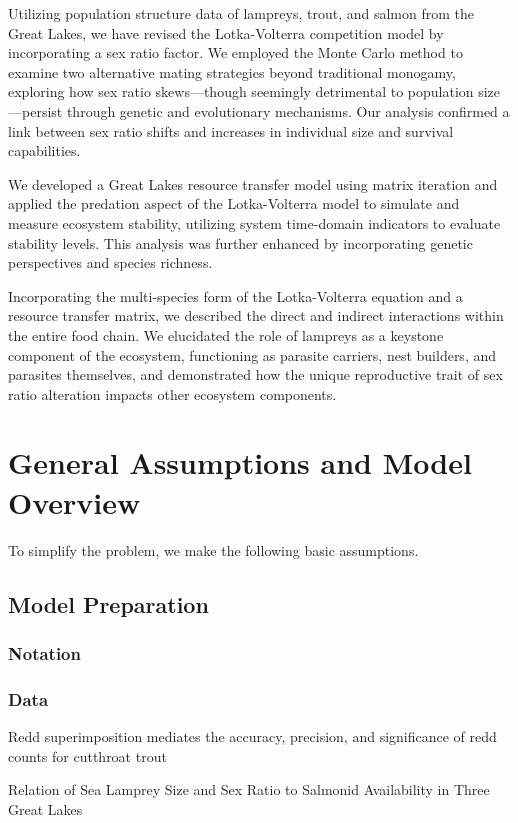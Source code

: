 \documentclass[12pt]{article}
\begin{document}
Utilizing population structure data of lampreys, trout, and salmon from the Great Lakes, we have revised the
Lotka-Volterra competition model by incorporating a sex ratio factor. We employed the Monte Carlo method to
examine two alternative mating strategies beyond traditional monogamy, exploring how sex ratio skews—though
seemingly detrimental to population size—persist through genetic and evolutionary mechanisms. Our analysis
confirmed a link between sex ratio shifts and increases in individual size and survival capabilities.

We developed a Great Lakes resource transfer model using matrix iteration and applied the predation aspect
of the Lotka-Volterra model to simulate and measure ecosystem stability, utilizing system time-domain
indicators to evaluate stability levels. This analysis was further enhanced by incorporating genetic
perspectives and species richness.

Incorporating the multi-species form of the Lotka-Volterra equation and a resource transfer matrix, we
described the direct and indirect interactions within the entire food chain. We elucidated the role of
lampreys as a keystone component of the ecosystem, functioning as parasite carriers, nest builders,
and parasites themselves, and demonstrated how the unique reproductive trait of sex ratio alteration
impacts other ecosystem components.
\section{General Assumptions and Model Overview}
To simplify the problem, we make the following basic assumptions.
\subsection*{Model Preparation}
\subsubsection*{Notation}
\subsubsection*{Data}

Redd superimposition mediates the accuracy, precision, and significance of redd counts for cutthroat trout\cite{baldock_redd_2023}

Relation of Sea Lamprey Size and Sex Ratio to Salmonid Availability in Three Great Lakes\cite{houston_relation_1991}
\end{document}
